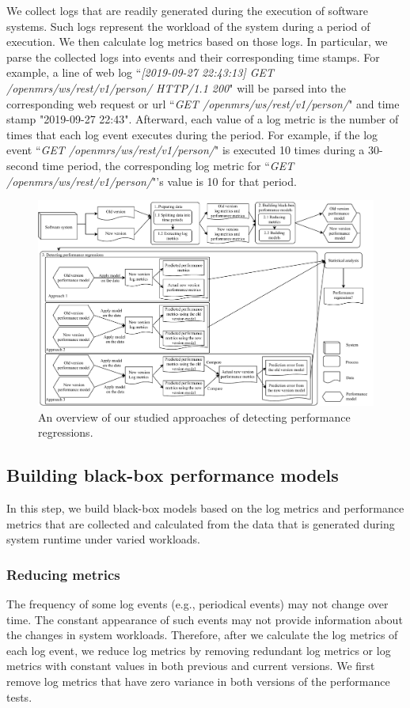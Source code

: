 We collect logs that are readily generated during the execution of software systems. Such logs represent the workload of the system during a period of execution. We then calculate log metrics based on those logs. In particular, we parse the collected logs into events and their corresponding time stamps. For example, a line of web log ``\emph{[2019-09-27 22:43:13] GET /openmrs/ws/rest/v1/person/ HTTP/1.1 200}" will be parsed into the corresponding web request or url ``\emph{GET /openmrs/ws/rest/v1/person/}" and time stamp "2019-09-27 22:43". Afterward, each value of a log metric is the number of times that each log event executes during the period. For example, if the log event ``\emph{GET /openmrs/ws/rest/v1/person/}" is executed 10 times during a 30-second time period, the corresponding log metric for ``\emph{GET /openmrs/ws/rest/v1/person/}"’s value is 10 for that period. 


\begin{figure}[tbh]
  \centering
  \includegraphics[width=\textwidth]{overview.pdf}
  \caption{An overview of our studied approaches of detecting performance regressions.}
  \label{fig:overview}
\end{figure}



\subsection{Building black-box performance models}
\label{sec:buildmodel}
In this step, we build black-box models based on the log metrics and performance metrics that are collected and calculated from the data that is generated during system runtime under varied workloads. 

\subsubsection{Reducing metrics}
The frequency of some log events (e.g., periodical events) may not change over time.
The constant appearance of such events may not provide information about the changes in system workloads.
Therefore, after we calculate the log metrics of each log event, we reduce log metrics by removing redundant log metrics or log metrics with constant values in both previous and current versions. We first remove log metrics that have zero variance in both versions of the performance tests. 

